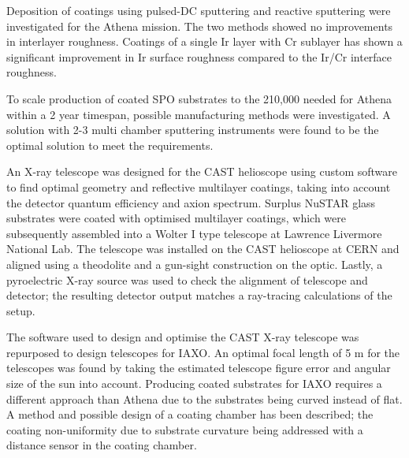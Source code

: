 Deposition of coatings using pulsed-DC sputtering and reactive sputtering were investigated for the Athena mission. The two methods showed no improvements in interlayer roughness. Coatings of a single Ir layer with Cr sublayer has shown a significant improvement in Ir surface roughness compared to the Ir/Cr interface roughness.

To scale production of coated SPO substrates to the 210,000 needed for Athena within a 2 year timespan, possible manufacturing methods were investigated. A solution with 2-3 multi chamber sputtering instruments were found to be the optimal solution to meet the requirements.

An X-ray telescope was designed for the CAST helioscope using custom software to find optimal geometry and reflective multilayer coatings, taking into account the detector quantum efficiency and axion spectrum. Surplus NuSTAR glass substrates were coated with optimised multilayer coatings, which were subsequently assembled into a Wolter I type telescope at Lawrence Livermore National Lab. The telescope was installed on the CAST helioscope at CERN and aligned using a theodolite and a gun-sight construction on the optic. Lastly, a pyroelectric X-ray source was used to check the alignment of telescope and detector; the resulting detector output matches a ray-tracing calculations of the setup.

The software used to design and optimise the CAST X-ray telescope was repurposed to design telescopes for IAXO. An optimal focal length of 5 m for the telescopes was found by taking the estimated telescope figure error and angular size of the sun into account. Producing coated substrates for IAXO requires a different approach than Athena due to the substrates being curved instead of flat. A method and possible design of a coating chamber has been described; the coating non-uniformity due to substrate curvature being addressed with a distance sensor in the coating chamber.

